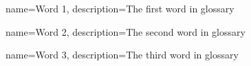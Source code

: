 {
  name=Word 1,
  description={The first word in glossary}
}

{
  name=Word 2,
  description={The second word in glossary}
}

{
  name=Word 3,
  description={The third word in glossary}
}



